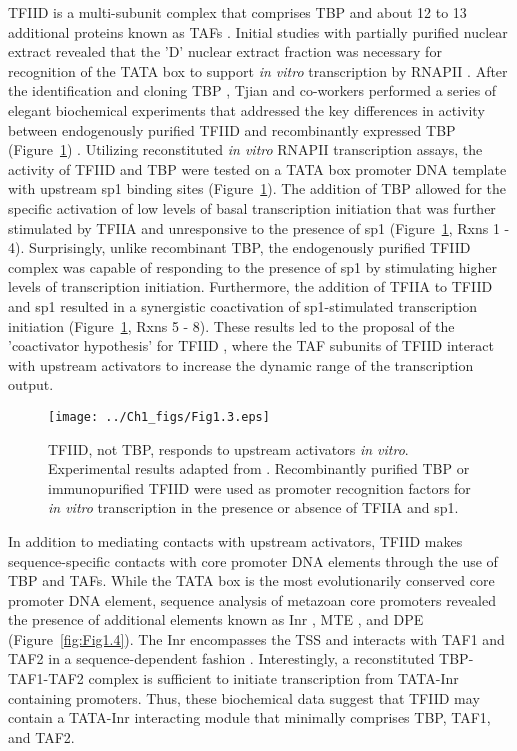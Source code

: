 TFIID is a multi-subunit complex that comprises TBP and about 12 to 13 additional proteins known as TAFs \cite{Burley_3049}. Initial studies with partially purified nuclear extract revealed that the 'D' nuclear extract fraction was necessary for recognition of the TATA box to support \emph{in vitro} transcription by RNAPII \cite{Matsui_3980}. After the identification and cloning TBP \cite{Buratowski_1988}, Tjian and co-workers performed a series of elegant biochemical experiments that addressed the key differences in activity between endogenously purified TFIID and recombinantly expressed TBP  (Figure~\ref{fig:Fig1.3})  \cite{Dynlacht_3551,Pugh_3586}. Utilizing reconstituted \emph{in vitro} RNAPII transcription assays, the activity of TFIID and TBP were tested on a TATA box promoter DNA template with upstream sp1 binding sites (Figure~\ref{fig:Fig1.3}). The addition of TBP allowed for the specific activation of low levels of basal transcription initiation that was further stimulated by TFIIA and unresponsive to the presence of sp1 (Figure~\ref{fig:Fig1.3}, Rxns 1 - 4). Surprisingly, unlike recombinant TBP, the endogenously purified TFIID complex was capable of responding to the presence of sp1 by stimulating higher levels of transcription initiation.  Furthermore, the addition of TFIIA to TFIID and sp1 resulted in a synergistic coactivation of sp1-stimulated transcription initiation (Figure~\ref{fig:Fig1.3}, Rxns 5 - 8). These results led to the proposal of the 'coactivator hypothesis' for TFIID \cite{Pugh_3586}, where the TAF subunits of TFIID interact with upstream activators to increase the dynamic range of the transcription output. \\
\begin{figure}
\centering
\texttt{[image: ../Ch1\_figs/Fig1.3.eps]}
\caption[TFIID, not TBP, responds to upstream activators \emph{in vitro}]{TFIID, not TBP, responds to upstream activators \emph{in vitro}. Experimental results adapted from \cite{Dynlacht_3551,Pugh_3586}. Recombinantly purified TBP or immunopurified TFIID were used as promoter recognition factors for \emph{in vitro} transcription in the presence or absence of TFIIA and sp1.} 
\label{fig:Fig1.3}
\end{figure}
\indent In addition to mediating contacts with upstream activators, TFIID makes sequence-specific contacts with core promoter DNA elements through the use of TBP and TAFs. While the TATA box is the most evolutionarily conserved core promoter DNA element, sequence analysis of metazoan core promoters revealed the presence of additional elements known as Inr \cite{Smale_3697}, MTE \cite{Lim_1522}, and DPE \cite{Burke_3081} (Figure~\ref{fig:Fig1.4}). The Inr encompasses the TSS and interacts with TAF1 and TAF2 in a sequence-dependent fashion \cite{Chalkley_2339,Verrijzer_3120}. Interestingly, a reconstituted TBP-TAF1-TAF2 complex is sufficient to initiate transcription from TATA-Inr containing promoters.  Thus, these biochemical data suggest that TFIID may contain a TATA-Inr interacting module that minimally comprises TBP, TAF1, and TAF2. \\
